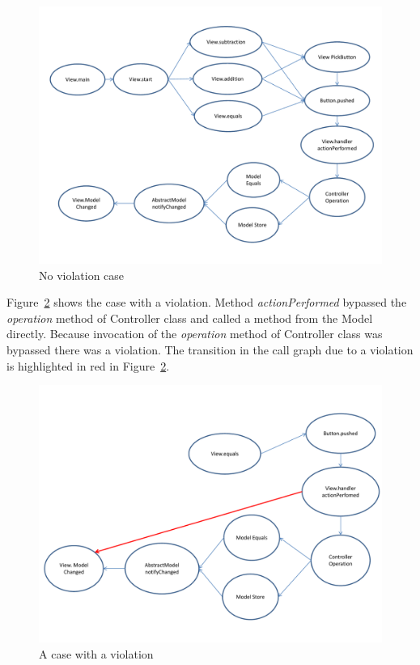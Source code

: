 \documentclass{acm_proc_article-sp}
\begin{document}
\begin{figure}
  \centering
  \includegraphics[keepaspectratio=true,scale=0.35]{noViolTrace.pdf}
  \caption{No violation case}
  \label{noViol}
\end{figure}

Figure~\ref{viol} shows the case with a violation. Method {\it actionPerformed} bypassed the {\it operation} method of Controller class and called a method from the Model directly. Because invocation of the {\it operation} method of Controller class was bypassed there was a violation. The transition in the call graph due to a violation is highlighted in red in Figure~\ref{viol}.

\begin{figure}
  \centering
  \includegraphics[keepaspectratio=true,scale=0.35]{violTrace.pdf}
  \caption{A case with a violation}
  \label{viol}
\end{figure}
\end{document}
